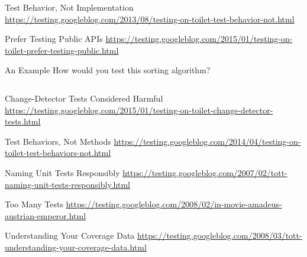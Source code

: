 \documentclass[10pt]{beamer}
\begin{document}
  \begin{frame}{Test Behavior, Not Implementation}
    \url{https://testing.googleblog.com/2013/08/testing-on-toilet-test-behavior-not.html}
  \end{frame}

  \begin{frame}{Prefer Testing Public APIs}
    \url{https://testing.googleblog.com/2015/01/testing-on-toilet-prefer-testing-public.html}
  \end{frame}

  \begin{frame}{An Example}
    How would you test this sorting algorithm?

    \vspace{0.25cm}

    \inputminted[fontsize=\scriptsize]{python}{tex/src/selection.py}
  \end{frame}

  \begin{frame}{Change-Detector Tests Considered Harmful}
    \url{https://testing.googleblog.com/2015/01/testing-on-toilet-change-detector-tests.html}
  \end{frame}

  \begin{frame}{Test Behaviors, Not Methods}
    \url{https://testing.googleblog.com/2014/04/testing-on-toilet-test-behaviors-not.html}
  \end{frame}

  \begin{frame}{Naming Unit Tests Responsibly}
    \url{https://testing.googleblog.com/2007/02/tott-naming-unit-tests-responsibly.html}
  \end{frame}

  \begin{frame}{Too Many Tests}
    \url{https://testing.googleblog.com/2008/02/in-movie-amadeus-austrian-emperor.html}
  \end{frame}

  \begin{frame}{Understanding Your Coverage Data}
    \url{https://testing.googleblog.com/2008/03/tott-understanding-your-coverage-data.html}
  \end{frame}
\end{document}
